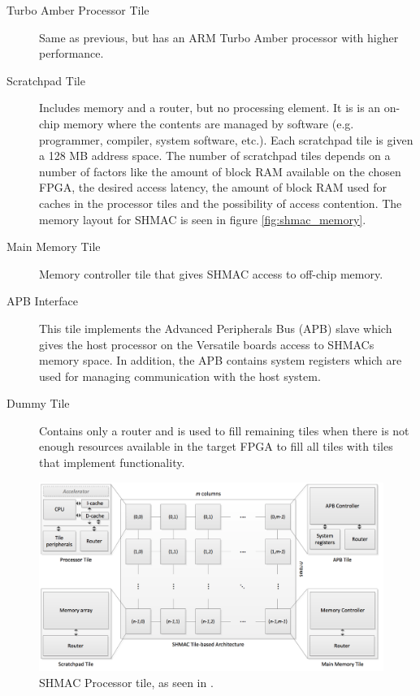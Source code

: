 \begin{description}
  
  \item[Turbo Amber Processor Tile] Same as previous, but has an ARM Turbo Amber processor with  higher performance.
  \item[Scratchpad Tile] Includes memory and a router, but no processing element. 
  It is is an on-chip memory where the contents are managed by software (e.g. programmer, compiler, system software, etc.).
  Each scratchpad tile is given a 128 MB address space.
  The number of scratchpad tiles depends on a number of factors like the amount of block RAM available on the chosen FPGA, the desired access latency, the amount of block RAM used for caches in the processor tiles and the possibility of access contention\cite{shmac-plan}.
  The memory layout for SHMAC is seen in figure \ref{fig:shmac_memory}.
  \item[Main Memory Tile] Memory controller tile that gives SHMAC access to off-chip memory.
  \item[APB Interface] This tile implements the Advanced Peripherals Bus (APB) slave which gives the host processor on the Versatile boards access to SHMACs memory space. 
  In addition, the APB contains system registers which are used for managing communication with the host system.
  \item[Dummy Tile] Contains only a router and is used to fill remaining tiles when there is not enough resources available in the target FPGA to fill all tiles with tiles that implement functionality.
\end{description}


\begin{figure}[htb]
    \centering
    \includegraphics[width=1.0\textwidth]{Figures/Heterogeneous/SHMAC}
    \caption{SHMAC Processor tile, as seen in \cite{shmac-plan}.}
    \label{fig:shmac-cpu}
\end{figure}


